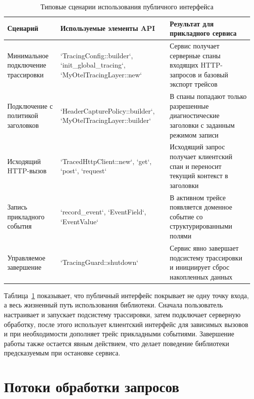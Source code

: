 \begin{table}[H]
    \centering
    \caption{Типовые сценарии использования публичного интерфейса}
    \label{tab:api-scenarios}
    \renewcommand{\arraystretch}{1.2}
    \begin{tabularx}{\textwidth}{>{\raggedright\arraybackslash}p{3.5cm} >{\raggedright\arraybackslash}X >{\raggedright\arraybackslash}X}
        \toprule
        Сценарий & Используемые элементы API & Результат для прикладного сервиса \\
        \midrule
        Минимальное подключение трассировки & `TracingConfig::builder`, `init_global_tracing`, `MyOtelTracingLayer::new` & Сервис получает серверные спаны входящих HTTP-запросов и базовый экспорт трейсов \\
        \addlinespace
        Подключение с политикой заголовков & `HeaderCapturePolicy::builder`, `MyOtelTracingLayer::builder` & В спаны попадают только разрешенные диагностические заголовки с заданным режимом записи \\
        \addlinespace
        Исходящий HTTP-вызов & `TracedHttpClient::new`, `get`, `post`, `request` & Исходящий запрос получает клиентский спан и переносит текущий контекст в заголовки \\
        \addlinespace
        Запись прикладного события & `record_event`, `EventField`, `EventValue` & В активном трейсе появляется доменное событие со структурированными полями \\
        \addlinespace
        Управляемое завершение & `TracingGuard::shutdown` & Сервис явно завершает подсистему трассировки и инициирует сброс накопленных данных \\
        \bottomrule
    \end{tabularx}
\end{table}

Таблица~\ref{tab:api-scenarios} показывает, что публичный интерфейс покрывает не
одну точку входа, а весь жизненный путь использования библиотеки. Сначала
пользователь настраивает и запускает подсистему трассировки, затем подключает
серверную обработку, после этого использует клиентский интерфейс для зависимых
вызовов и при необходимости дополняет трейс прикладными событиями. Завершение
работы также остается явным действием, что делает поведение библиотеки
предсказуемым при остановке сервиса.

\section{Потоки обработки запросов}

